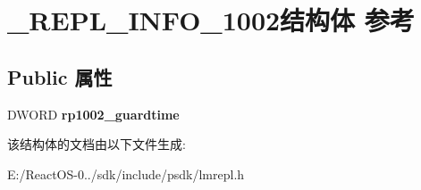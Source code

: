 \hypertarget{struct___r_e_p_l___i_n_f_o__1002}{}\section{\+\_\+\+R\+E\+P\+L\+\_\+\+I\+N\+F\+O\+\_\+1002结构体 参考}
\label{struct___r_e_p_l___i_n_f_o__1002}
\subsection*{Public 属性}
\begin{DoxyCompactItemize}
\item 
\mbox{\label{struct___r_e_p_l___i_n_f_o__1002_ab007aa1f85316b9409a60421c045d470}} 
D\+W\+O\+RD {\bfseries rp1002\+\_\+guardtime}
\end{DoxyCompactItemize}


该结构体的文档由以下文件生成\+:\begin{DoxyCompactItemize}
\item 
E\+:/\+React\+O\+S-\/0../sdk/include/psdk/lmrepl.\+h\end{DoxyCompactItemize}
